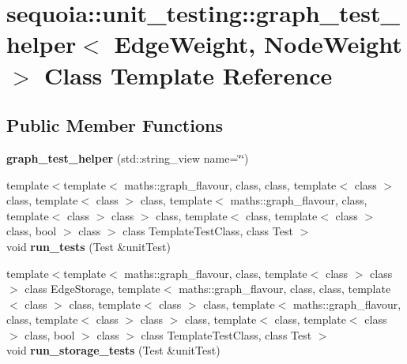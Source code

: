 \hypertarget{classsequoia_1_1unit__testing_1_1graph__test__helper}{}\section{sequoia\+::unit\+\_\+testing\+::graph\+\_\+test\+\_\+helper$<$ Edge\+Weight, Node\+Weight $>$ Class Template Reference}
\label{classsequoia_1_1unit__testing_1_1graph__test__helper}
\subsection*{Public Member Functions}
\begin{DoxyCompactItemize}
\item 
\mbox{\label{classsequoia_1_1unit__testing_1_1graph__test__helper_a13e75dd4599f0ee9aff3900b1dc22b9a}} 
{\bfseries graph\+\_\+test\+\_\+helper} (std\+::string\+\_\+view name=\char`\"{}\char`\"{})
\item 
\mbox{\label{classsequoia_1_1unit__testing_1_1graph__test__helper_a5accccff0297c42ee4f54414663b23c0}} 
{\footnotesize template$<$template$<$ maths\+::graph\+\_\+flavour, class, class, template$<$ class $>$ class, template$<$ class $>$ class, template$<$ maths\+::graph\+\_\+flavour, class, template$<$ class $>$ class $>$ class, template$<$ class, template$<$ class $>$ class, bool $>$ class $>$ class Template\+Test\+Class, class Test $>$ }\\void {\bfseries run\+\_\+tests} (Test \&unit\+Test)
\item 
\mbox{\label{classsequoia_1_1unit__testing_1_1graph__test__helper_a5b74204ae9be58a9133cf944f431fcaf}} 
{\footnotesize template$<$template$<$ maths\+::graph\+\_\+flavour, class, template$<$ class $>$ class $>$ class Edge\+Storage, template$<$ maths\+::graph\+\_\+flavour, class, class, template$<$ class $>$ class, template$<$ class $>$ class, template$<$ maths\+::graph\+\_\+flavour, class, template$<$ class $>$ class $>$ class, template$<$ class, template$<$ class $>$ class, bool $>$ class $>$ class Template\+Test\+Class, class Test $>$ }\\void {\bfseries run\+\_\+storage\+\_\+tests} (Test \&unit\+Test)

\end{DoxyCompactItemize}
